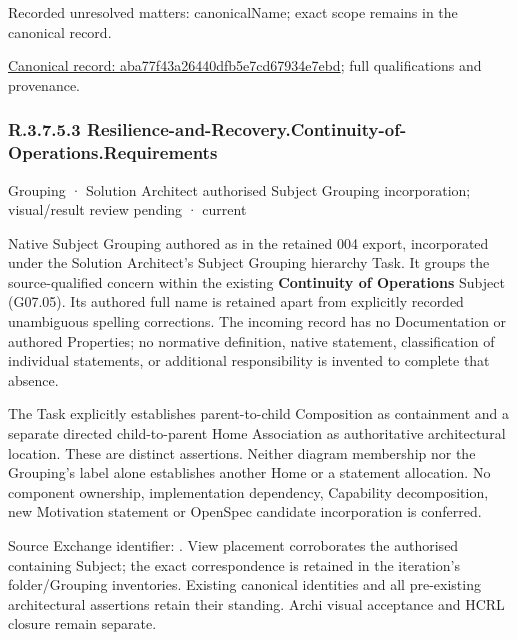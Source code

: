 {\small Recorded unresolved matters: canonicalName; exact scope remains in the canonical record.}\par
{\footnotesize \href{../../../../continuum/grouping/aba77f43a26440dfb5e7cd67934e7ebd.md}{Canonical record: aba77f43a26440dfb5e7cd67934e7ebd}; full qualifications and provenance.}\par
\subsubsection*{R.3.7.5.3 Resilience-and-Recovery.Continuity-of-Operations.Requirements}
\label{navigation:R.3.7.5.3}

\label{element:709d34e55e7b4c7a9e010f5465f76473}
{\small Grouping · Solution Architect authorised Subject Grouping incorporation; visual/result review pending · current}\par

Native Subject Grouping authored as \texttt{} in the retained 004 export,
incorporated under the Solution Architect's Subject Grouping hierarchy Task.
It groups the source-qualified \texttt{} concern within
the existing \textbf{Continuity of Operations} Subject (G07.05). Its authored full name
is retained apart from explicitly recorded unambiguous spelling corrections.
The incoming record has no Documentation or authored Properties; no normative
definition, native statement, classification of individual statements, or
additional responsibility is invented to complete that absence.



The Task explicitly establishes parent-to-child Composition as containment and
a separate directed child-to-parent Home Association as authoritative architectural
location. These are distinct assertions. Neither diagram membership nor the
Grouping's label alone establishes another Home or a statement allocation.
No component ownership, implementation dependency, Capability decomposition,
new Motivation statement or OpenSpec candidate incorporation is conferred.



Source Exchange identifier: \texttt{}. View placement corroborates
the authorised containing Subject; the exact correspondence is retained in the
iteration's folder/Grouping inventories. Existing canonical identities and all
pre-existing architectural assertions retain their standing. Archi visual
acceptance and HCRL closure remain separate.


